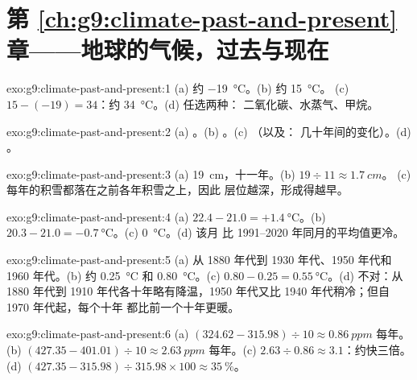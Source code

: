 \section*{第 \ref{ch:g9:climate-past-and-present} 章——地球的气候，过去与现在}

\begin{solution}{exo:g9:climate-past-and-present:1}
(a) 约 \qty{-19}{\degreeCelsius}。(b) 约 \qty{15}{\degreeCelsius}。
(c) $15 - (-19) = 34$：约 \qty{34}{\degreeCelsius}。(d) 任选两种：
二氧化碳、水蒸气、甲烷。
\end{solution}

\begin{solution}{exo:g9:climate-past-and-present:2}
(a) 。(b) 。(c) （以及：
几十年间的变化）。(d) 。
\end{solution}

\begin{solution}{exo:g9:climate-past-and-present:3}
(a) \qty{19}{cm}，十一年。(b) $19 \div 11 \approx \qty{1.7}{cm}$。
(c) 每年的积雪都落在之前各年积雪之上，因此
层位越深，形成得越早。
\end{solution}

\begin{solution}{exo:g9:climate-past-and-present:4}
(a) $22.4 - 21.0 = +\qty{1.4}{\degreeCelsius}$。(b) $20.3 - 21.0 =
\qty{-0.7}{\degreeCelsius}$。(c) \qty{0}{\degreeCelsius}。(d) 该月
比 1991--2020 年同月的平均值更冷。
\end{solution}

\begin{solution}{exo:g9:climate-past-and-present:5}
(a) 从 1880 年代到 1930 年代、1950 年代和 1960 年代。(b) 约
\qty{0.25}{\degreeCelsius} 和 \qty{0.80}{\degreeCelsius}。(c) $0.80 -
0.25 = \qty{0.55}{\degreeCelsius}$。(d) 不对：从 1880 年代到
1910 年代各十年略有降温，1950 年代又比
1940 年代稍冷；但自 1970 年代起，每个十年
都比前一个十年更暖。
\end{solution}

\begin{solution}{exo:g9:climate-past-and-present:6}
(a) $(324.62 - 315.98) \div 10 \approx \qty{0.86}{ppm}$ 每年。(b)
$(427.35 - 401.01) \div 10 \approx \qty{2.63}{ppm}$ 每年。(c) $2.63
\div 0.86 \approx 3.1$：约快三倍。(d) $(427.35 - 315.98)
\div 315.98 \times 100 \approx 35~\%$。
\end{solution}

